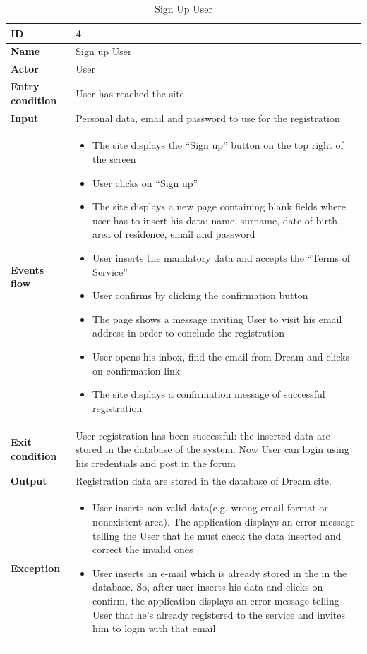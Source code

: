 \begin{longtable}{p{} | p{}}
 \caption{Sign Up User}
    \label{tab:sign_up}\\
        \hline
        \textbf{ID} & 4\\
        \hline
        \textbf{Name}  &  Sign up User\\
        \hline
        \textbf{Actor}  &  User\\
        \hline
        \textbf{Entry condition}  &  User has reached the site\\
        \hline
        \textbf{Input} & Personal data,
        email and password to use for the registration\\
        \hline
        \textbf{Events flow} & \begin{itemize}
                \item The site displays the “Sign up” button on the top right of the screen
                \item User clicks on “Sign up”
                \item The site displays a new page containing blank fields where user has to insert his data: name, surname, date of birth, area of residence, email and password
                \item User inserts the mandatory data and accepts the “Terms of Service”
                \item User confirms by clicking the confirmation button
                \item The page shows a message inviting User to visit his email address in order to conclude the registration
                \item User opens his inbox, find the email from Dream and clicks on confirmation link
                \item The site displays a confirmation message of successful registration
                \end{itemize}
                 \\
        \hline
        \textbf{Exit condition} & User registration has been successful: the inserted data are stored in the database of the system. Now User can login using his credentials and post in the forum\\
        \hline
        \textbf{Output} & Registration data are stored in the database of Dream site.\\
        \hline
        \textbf{Exception} & \begin{itemize}
            \item User inserts non valid data(e.g. wrong email format or nonexistent area). The application displays an error message telling the User that he must check the data inserted and correct the invalid ones
            \item User inserts an e-mail which is already stored in the in the database. So, after user inserts his data and clicks on confirm, the application displays an error message telling User that he’s already registered to the service and invites him to login with that email
    \end{itemize} \\\hline
   
    \end{longtable}
